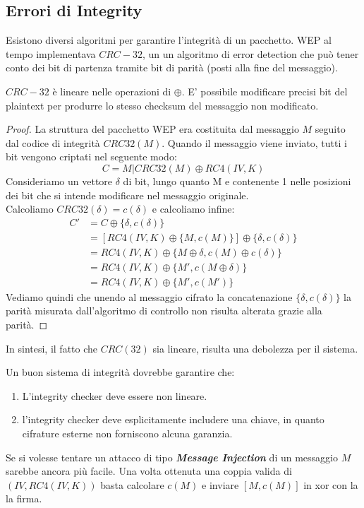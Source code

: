 \subsection{Errori di Integrity}
Esistono diversi algoritmi per garantire l'integrità di un pacchetto. WEP al tempo implementava $CRC-32$, un un algoritmo di error detection che può tener conto dei bit di partenza tramite bit di parità (posti alla fine del messaggio).
\begin{theorem}
$CRC-32$ è lineare nelle operazioni di $\oplus$. E' possibile modificare precisi bit del plaintext per produrre lo stesso checksum del messaggio non modificato.
\end{theorem}
\begin{proof}
La struttura del pacchetto WEP era costituita dal messaggio $M$ seguito dal codice di integrità $CRC32(M)$. Quando il messaggio viene inviato, tutti i bit vengono criptati nel seguente modo:
\[
C= M|CRC32(M)\oplus{RC4(IV, K)}
\]
Consideriamo un vettore $\delta$ di bit, lungo quanto M e contenente 1 nelle posizioni dei bit che si intende modificare nel messaggio originale.\\
Calcoliamo $CRC32(\delta)=c(\delta)$ e calcoliamo infine:
\begin{equation*}
    \begin{aligned}
    C'&=C\oplus\{\delta,c(\delta)\}\\
    &=[RC4(IV,K)\oplus{\{M,c(M)\}}]\oplus\{\delta,c(\delta)\}\\
    &=RC4(IV,K)\oplus\{M\oplus{\delta},c(M)\oplus{c(\delta)}\}\\
    &=RC4(IV,K)\oplus\{M',c(M\oplus{\delta})\}\\
    &=RC4(IV,K)\oplus\{M',c(M')\}
    \end{aligned}
\end{equation*}
Vediamo quindi che unendo al messaggio cifrato la concatenazione $\{\delta,c(\delta)\}$ la parità misurata dall'algoritmo di controllo non risulta alterata grazie alla parità.
\end{proof}
\begin{remark}
In sintesi, il fatto che $CRC(32)$ sia lineare, risulta una debolezza per il sistema.
\end{remark}
\begin{proposition}
Un buon sistema di integrità dovrebbe garantire che:
\begin{enumerate}
    \item L'integrity checker deve essere non lineare.
    \item l'integrity checker deve esplicitamente includere una chiave, in quanto cifrature esterne non forniscono alcuna garanzia.
\end{enumerate}
\end{proposition}
\begin{remark}
Se si volesse tentare un attacco di tipo \textbf{\textit{Message Injection}} di un messaggio $M$ sarebbe ancora più facile. Una volta ottenuta una coppia valida di $(IV,RC4(IV,K))$ basta calcolare $c(M)$ e inviare $[M,c(M)]$ in xor con la la firma.
\end{remark}